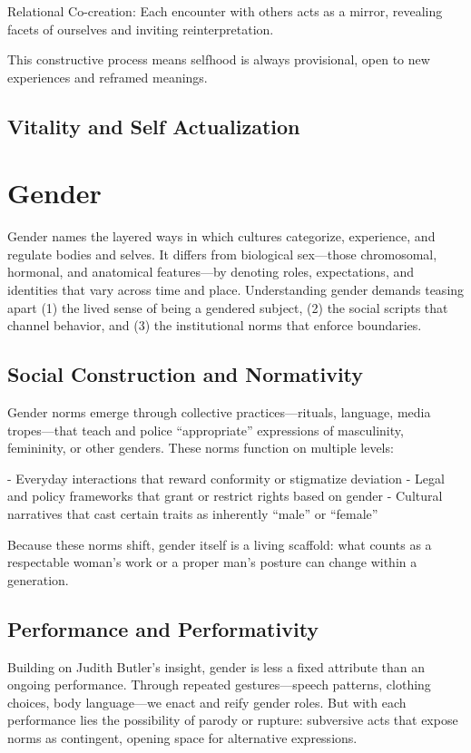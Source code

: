 \documentclass[a4paper]{article}
\begin{document}
Relational Co-creation: Each encounter with others acts as a mirror, revealing facets of ourselves and inviting reinterpretation.

This constructive process means selfhood is always provisional, open to new experiences and reframed meanings.

\subsection{Vitality and Self Actualization}

\section{Gender}
Gender names the layered ways in which cultures categorize, experience, and regulate bodies and selves. 
It differs from biological sex—those chromosomal, hormonal, and anatomical features—by denoting roles, expectations, and identities that vary across time and place. 
Understanding gender demands teasing apart (1) the lived sense of being a gendered subject, (2) the social scripts that channel behavior, and (3) the institutional norms that enforce boundaries.

\subsection{Social Construction and Normativity}
Gender norms emerge through collective practices—rituals, language, media tropes—that teach and police “appropriate” expressions of masculinity, femininity, or other genders. These norms function on multiple levels:

- Everyday interactions that reward conformity or stigmatize deviation
- Legal and policy frameworks that grant or restrict rights based on gender
- Cultural narratives that cast certain traits as inherently “male” or “female”

Because these norms shift, gender itself is a living scaffold: what counts as a respectable woman’s work or a proper man’s posture can change within a generation.

\subsection{Performance and Performativity}
Building on Judith Butler’s insight, gender is less a fixed attribute than an ongoing performance. 
Through repeated gestures—speech patterns, clothing choices, body language—we enact and reify gender roles. 
But with each performance lies the possibility of parody or rupture: subversive acts that expose norms as contingent, opening space for alternative expressions.
\end{document}
